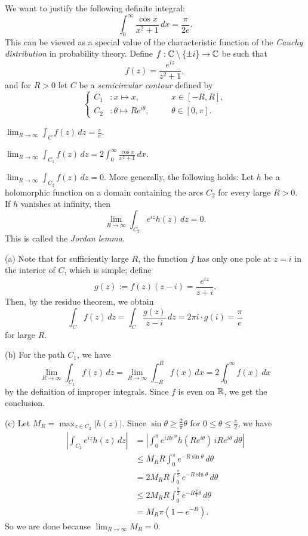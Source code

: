 \documentclass{../../large}
\begin{document}
\begin{prb}
We want to justify the following definite integral:
\[\int_0^\infty\frac{\cos x}{x^2+1}\,dx=\frac\pi{2e}.\]
This can be viewed as a special value of the characteristic function of the \emph{Cauchy distribution} in probability theory.
Define $f:\mathbb{C}\setminus\{\pm i\}\to\mathbb{C}$ be such that
\[f(z)=\frac{e^{iz}}{z^2+1},\]
and for $R>0$ let $C$ be a \emph{semicircular contour} defined by
\[\left\{
\begin{alignedat}{2}
C_1&:x\mapsto x,&\quad&x\in[-R,R],\\
C_2&:\theta\mapsto Re^{i\theta},&&\theta\in[0,\pi].
\end{alignedat}
\right.\]
\begin{parts}
\item $\lim_{R\to\infty}\int_Cf(z)\,dz=\frac\pi e$.
\item $\lim_{R\to\infty}\int_{C_1}f(z)\,dz=2\int_0^\infty\frac{\cos x}{x^2+1}\,dx$.
\item $\lim_{R\to\infty}\int_{C_2}f(z)\,dz=0$. More generally, the following holds: Let $h$ be a holomorphic function on a domain containing the arcs $C_2$ for every large $R>0$.
If $h$ vanishes at infinity, then
\[\lim_{R\to\infty}\int_{C_2}e^{iz}h(z)\,dz=0.\]
This is called the \emph{Jordan lemma}.
\end{parts}
\end{prb}
\begin{pf}
(a)
Note that for sufficiently large $R$, the function $f$ has only one pole at $z=i$ in the interior of $C$, which is simple; define
\[g(z):=f(z)(z-i)=\frac{e^{iz}}{z+i}.\]
Then, by the residue theorem, we obtain
\[\int_Cf(z)\,dz=\int_C\frac{g(z)}{z-i}\,dz=2\pi i\cdot g(i)=\frac\pi e\]
for large $R$.

(b)
For the path $C_1$, we have
\[\lim_{R\to\infty}\int_{C_1}f(z)\,dz=\lim_{R\to\infty}\int_{-R}^Rf(x)\,dx=2\int_0^\infty f(x)\,dx\]
by the definition of improper integrals.
Since $f$ is even on $\mathbb{R}$, we get the conclusion.

(c)
Let $M_R=\max_{z\in C_2}|h(z)|$.
Since $\sin\theta\ge\frac2\pi\theta$ for $0\le\theta\le\frac\pi2$, we have
\begin{align*}
|\int_{C_2}e^{iz}h(z)\,dz|
&=|\int_0^\pi e^{iRe^{i\theta}}h(Re^{i\theta})\,iRe^{i\theta}\,d\theta|\\
&\le M_RR\int_0^\pi e^{-R\sin\theta}\,d\theta\\
&=2M_RR\int_0^{\frac\pi2}e^{-R\sin\theta}\,d\theta\\
&\le2M_RR\int_0^{\frac\pi2}e^{-R\frac2\pi\theta}\,d\theta\\\
&=M_R\pi(1-e^{-R}).
\end{align*}
So we are done because $\lim_{R\to\infty}M_R=0$.
\end{pf}
\end{document}

